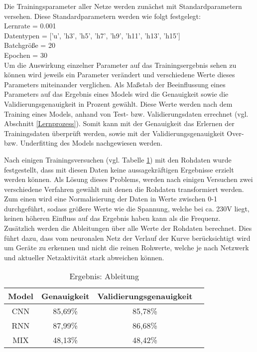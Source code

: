     \noindent
    Die Trainingsparameter aller Netze werden zunächst mit Standardparametern versehen.
    \newline
    \noindent
    Diese Standardparametern werden wie folgt festgelegt:\\
    \noindent
    Lernrate = 0.001\\
    \noindent
    Datentypen = ['u', 'h3', 'h5', 'h7', 'h9', 'h11', 'h13', 'h15']\\
    \noindent
    Batchgröße = 20\\
    \noindent
    Epochen = 30\\

    \noindent
    Um die Auswirkung einzelner Parameter auf das Trainingsergebnis sehen zu können wird jeweils ein Parameter verändert und verschiedene Werte dieses Parameters miteinander verglichen.
    \newline
    \noindent
    Als Maßstab der Beeinflussung eines Parameters auf das Ergebnis eines Models wird die Genauigkeit sowie die Validierungsgenauigkeit in Prozent gewählt.
    Diese Werte werden nach dem Training eines Models, anhand von Test- bzw. Validierungsdaten errechnet (vgl. Abschnitt \ref{Lernprozess}). 
    Somit kann mit der Genauigkeit das Erlernen der Trainingsdaten überprüft werden, sowie mit der Validierungsgenauigkeit Over- bzw. Underfitting des Models nachgewiesen werden.
    \newline

    \noindent
    Nach einigen Trainingsversuchen (vgl. Tabelle \ref{tabl:ErgebnisAbleitung}) mit den Rohdaten wurde festgestellt, dass mit diesen Daten keine aussagekräftigen Ergebnisse erzielt werden können.
    Als Lösung dieses Problems, werden nach einigen Versuchen zwei verschiedene Verfahren gewählt mit denen die Rohdaten transformiert werden. \\
    \noindent
    Zum einen wird eine Normalisierung der Daten in Werte zwischen 0-1 durchgeführt, sodass größere Werte wie die Spannung, welche bei ca. 230V liegt, keinen höheren Einfluss auf das Ergebnis haben kann als die Frequenz.\\
    \noindent
    Zusätzlich werden die Ableitungen über alle Werte der Rohdaten berechnet.
    Dies führt dazu, dass vom neuronalen Netz der Verlauf der Kurve berücksichtigt wird um Geräte zu erkennen und nicht die reinen Rohwerte, welche je nach Netzwerk und aktueller Netzaktivität stark abweichen können.

    \begin{table}[H]
        \centering
        \begin{tabular}{|c|c|c|c|}
            \hline
            Model & Genauigkeit & Validierungsgenauigkeit \\
            \hline
            CNN & 85,69\% & 85,78\% \\
            \hline
            RNN & 87,99\% & 86,68\% \\
            \hline
            MIX & 48,13\% & 48,42\% \\
            \hline
        \end{tabular}
        \caption{Ergebnis: Ableitung}
        \label{tabl:ErgebnisAbleitung}
    \end{table}

